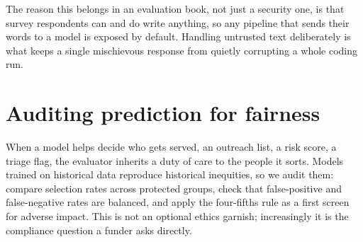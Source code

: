 \documentclass[
    a4paper,
    fontsize=10pt,
    twoside=true,
    numbers=noenddot,
]{kaobook}
\begin{document}
The reason this belongs in an evaluation book, not just a security one, is that survey respondents can and do write anything, so any pipeline that sends their words to a model is exposed by default. Handling untrusted text deliberately is what keeps a single mischievous response from quietly corrupting a whole coding run.

\section{Auditing prediction for fairness}\label{sec:fairness}
When a model helps decide who gets served, an outreach list, a risk score, a triage flag, the evaluator inherits a duty of care to the people it sorts. Models trained on historical data reproduce historical inequities, so we audit them: compare selection rates across protected groups, check that false-positive and false-negative rates are balanced, and apply the four-fifths rule as a first screen for adverse impact. This is not an optional ethics garnish; increasingly it is the compliance question a funder asks directly.
\end{document}
